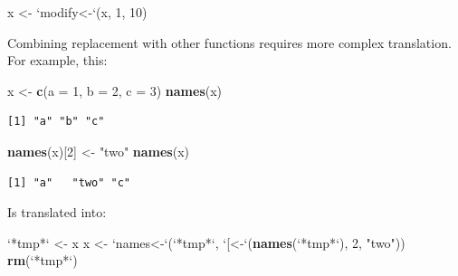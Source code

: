 \documentclass[]{book}
\newenvironment{Shaded}{\begin{snugshade}}{\end{snugshade}}
\newcommand{\DataTypeTok}[1]{\textcolor[rgb]{0.13,0.29,0.53}{#1}}
\newcommand{\DecValTok}[1]{\textcolor[rgb]{0.00,0.00,0.81}{#1}}
\newcommand{\KeywordTok}[1]{\textcolor[rgb]{0.13,0.29,0.53}{\textbf{#1}}}
\newcommand{\NormalTok}[1]{#1}
\newcommand{\StringTok}[1]{\textcolor[rgb]{0.31,0.60,0.02}{#1}}
\theoremstyle{definition}
\theoremstyle{definition}
\theoremstyle{definition}
\theoremstyle{remark}
\begin{document}
\begin{Shaded}
\begin{Highlighting}[]
\NormalTok{x <-}\StringTok{ `}\DataTypeTok{modify<-}\StringTok{`}\NormalTok{(x, }\DecValTok{1}\NormalTok{, }\DecValTok{10}\NormalTok{)}
\end{Highlighting}
\end{Shaded}

Combining replacement with other functions requires more complex
translation. For example, this:

\begin{Shaded}
\begin{Highlighting}[]
\NormalTok{x <-}\StringTok{ }\KeywordTok{c}\NormalTok{(}\DataTypeTok{a =} \DecValTok{1}\NormalTok{, }\DataTypeTok{b =} \DecValTok{2}\NormalTok{, }\DataTypeTok{c =} \DecValTok{3}\NormalTok{)}
\KeywordTok{names}\NormalTok{(x)}
\end{Highlighting}
\end{Shaded}

\begin{verbatim}
[1] "a" "b" "c"
\end{verbatim}

\begin{Shaded}
\begin{Highlighting}[]
\KeywordTok{names}\NormalTok{(x)[}\DecValTok{2}\NormalTok{] <-}\StringTok{ "two"}
\KeywordTok{names}\NormalTok{(x)}
\end{Highlighting}
\end{Shaded}

\begin{verbatim}
[1] "a"   "two" "c"  
\end{verbatim}

Is translated into:

\begin{Shaded}
\begin{Highlighting}[]
\StringTok{`}\DataTypeTok{*tmp*}\StringTok{`}\NormalTok{ <-}\StringTok{ }\NormalTok{x}
\NormalTok{x <-}\StringTok{ `}\DataTypeTok{names<-}\StringTok{`}\NormalTok{(}\StringTok{`}\DataTypeTok{*tmp*}\StringTok{`}\NormalTok{, }\StringTok{`}\DataTypeTok{[<-}\StringTok{`}\NormalTok{(}\KeywordTok{names}\NormalTok{(}\StringTok{`}\DataTypeTok{*tmp*}\StringTok{`}\NormalTok{), }\DecValTok{2}\NormalTok{, }\StringTok{"two"}\NormalTok{))}
\KeywordTok{rm}\NormalTok{(}\StringTok{`}\DataTypeTok{*tmp*}\StringTok{`}\NormalTok{)}
\end{Highlighting}
\end{Shaded}
\end{document}
